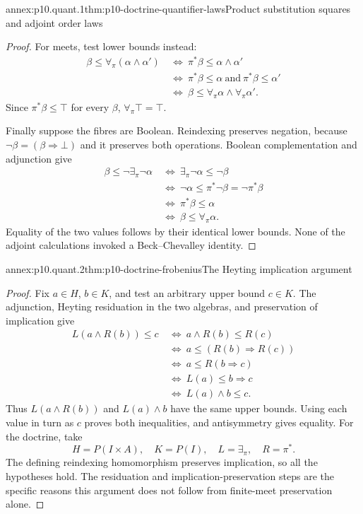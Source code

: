 \begin{annexitem}{annex:p10.quant.1}{thm:p10-doctrine-quantifier-laws}{Product substitution squares and adjoint order laws}
\begin{proof}
For meets, test lower bounds instead:
\[
 \begin{aligned}
 \beta\leq\forall_\pi(\alpha\wedge\alpha')
 &\ \Longleftrightarrow\
       \pi^*\beta\leq\alpha\wedge\alpha'\\
 &\ \Longleftrightarrow\
       \pi^*\beta\leq\alpha\ \text{and}\ \pi^*\beta\leq\alpha'\\
 &\ \Longleftrightarrow\
       \beta\leq\forall_\pi\alpha\wedge\forall_\pi\alpha'.
 \end{aligned}
\]
Since \(\pi^*\beta\leq\top\) for every \(\beta\),
\(\forall_\pi\top=\top\).

Finally suppose the fibres are Boolean.
Reindexing preserves negation, because
\(\neg\beta=(\beta\Rightarrow\bot)\) and it preserves
both operations.  Boolean complementation and adjunction give
\[
 \begin{aligned}
 \beta\leq\neg\exists_\pi\neg\alpha
 &\ \Longleftrightarrow\
       \exists_\pi\neg\alpha\leq\neg\beta\\
 &\ \Longleftrightarrow\
       \neg\alpha\leq\pi^*\neg\beta=\neg\pi^*\beta\\
 &\ \Longleftrightarrow\
       \pi^*\beta\leq\alpha\\
 &\ \Longleftrightarrow\
       \beta\leq\forall_\pi\alpha .
 \end{aligned}
\]
Equality of the two values follows by their identical
lower bounds.
None of the adjoint calculations invoked a Beck--Chevalley
identity.
\end{proof}
\end{annexitem}

\begin{annexitem}{annex:p10.quant.2}{thm:p10-doctrine-frobenius}{The Heyting implication argument}
\begin{proof}
Fix \(a\in H\), \(b\in K\), and test an arbitrary upper
bound \(c\in K\).
The adjunction, Heyting residuation in the two algebras,
and preservation of implication give
\[
 \begin{aligned}
 L(a\wedge R(b))\leq c
 &\ \Longleftrightarrow\ a\wedge R(b)\leq R(c)\\
 &\ \Longleftrightarrow\ a\leq(R(b)\Rightarrow R(c))\\
 &\ \Longleftrightarrow\ a\leq R(b\Rightarrow c)\\
 &\ \Longleftrightarrow\ L(a)\leq b\Rightarrow c\\
 &\ \Longleftrightarrow\ L(a)\wedge b\leq c.
 \end{aligned}
\]
Thus \(L(a\wedge R(b))\) and \(L(a)\wedge b\) have the
same upper bounds.  Using each value in turn as \(c\)
proves both inequalities, and antisymmetry gives equality.
For the doctrine, take
\[
 H=P(I\times A),\quad K=P(I),\quad
 L=\exists_\pi,\quad R=\pi^*.
\]
The defining reindexing homomorphism preserves implication,
so all the hypotheses hold.
The residuation and implication-preservation steps are the
specific reasons this argument does not follow from
finite-meet preservation alone.
\end{proof}
\end{annexitem}

